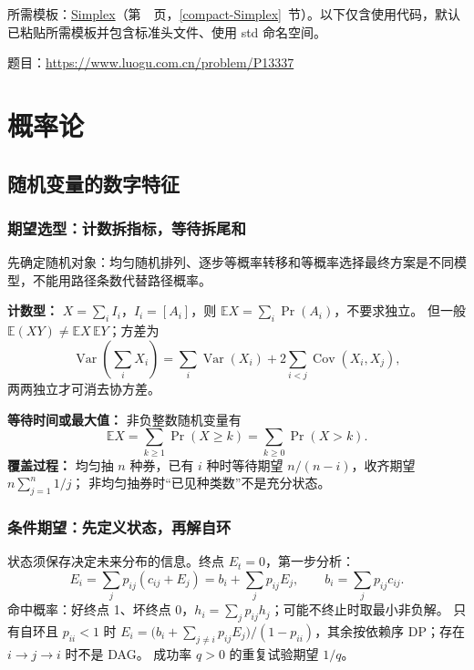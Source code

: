 所需模板：\hyperref[compact-Simplex]{Simplex}（第~\pageref{compact-Simplex}~页，\ref{compact-Simplex}~节）。以下仅含使用代码，默认已粘贴所需模板并包含标准头文件、使用 std 命名空间。

题目：\url{https://www.luogu.com.cn/problem/P13337}



\Needspace{180pt}

\chapter{概率论}

\section{随机变量的数字特征}

\subsection{期望选型：计数拆指标，等待拆尾和}\label{knowledge-expectation}
先确定随机对象：均匀随机排列、逐步等概率转移和等概率选择最终方案是不同模型，不能用路径条数代替路径概率。

\textbf{计数型：} $X=\sum_iI_i$，$I_i=[A_i]$，则 $\mathbb E X=\sum_i\Pr(A_i)$，不要求独立。
但一般 $\mathbb E(XY)\ne\mathbb E X\,\mathbb E Y$；方差为
\[
\operatorname{Var}\!\left(\sum_iX_i\right)
=\sum_i\operatorname{Var}(X_i)+2\sum_{i<j}\operatorname{Cov}(X_i,X_j),
\]
两两独立才可消去协方差。

\textbf{等待时间或最大值：} 非负整数随机变量有
\[
\mathbb E X=\sum_{k\ge1}\Pr(X\ge k)=\sum_{k\ge0}\Pr(X>k).
\]
\textbf{覆盖过程：} 均匀抽 $n$ 种券，已有 $i$ 种时等待期望 $n/(n-i)$，收齐期望 $n\sum_{j=1}^n1/j$；
非均匀抽券时“已见种类数”不是充分状态。



\subsection{条件期望：先定义状态，再解自环}\label{knowledge-probability-dp}
状态须保存决定未来分布的信息。终点 $E_t=0$，第一步分析：
\[
E_i=\sum_jp_{ij}(c_{ij}+E_j)=b_i+\sum_jp_{ij}E_j,
\qquad b_i=\sum_jp_{ij}c_{ij}.
\]
命中概率：好终点 1、坏终点 0，$h_i=\sum_jp_{ij}h_j$；可能不终止时取最小非负解。
只有自环且 $p_{ii}<1$ 时
$E_i=\bigl(b_i+\sum_{j\ne i}p_{ij}E_j\bigr)/(1-p_{ii})$，其余按依赖序 DP；存在 $i\to j\to i$ 时不是 DAG。
成功率 $q>0$ 的重复试验期望 $1/q$。

